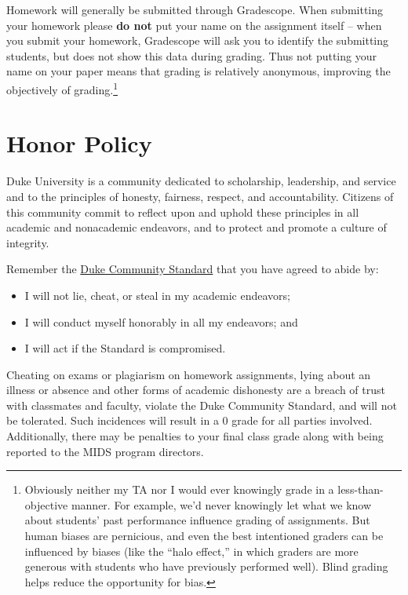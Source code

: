 \documentclass[12pt]{article}
\begin{document}
Homework will generally be submitted through Gradescope. When submitting your homework please {\color{red}\textbf{do not}} put your name on the assignment itself -- when you submit your homework, Gradescope will ask you to identify the submitting students, but does not show this data during grading. Thus not putting your name on your paper means that grading is relatively anonymous, improving the objectively of grading.\footnote{Obviously neither my TA nor I would ever knowingly grade in a less-than-objective manner. For example, we'd never knowingly let what we know about students' past performance influence grading of assignments. But human biases are pernicious, and even the best intentioned graders can be influenced by biases (like the ``halo effect,'' in which graders are more generous with students who have previously performed well). Blind grading helps reduce the opportunity for bias.}


\section{Honor Policy}

Duke University is a community dedicated to scholarship, leadership, and service and to the principles of honesty, fairness, respect, and accountability. Citizens of this community commit to reflect upon and uphold these principles in all academic and nonacademic endeavors, and to protect and promote a culture of integrity.

Remember the \href{https://studentaffairs.duke.edu/conduct/about-us/duke-community-standard}{Duke Community Standard} that you have agreed to abide by:

\begin{itemize}
	\item I will not lie, cheat, or steal in my academic endeavors;
	\item I will conduct myself honorably in all my endeavors; and
	\item I will act if the Standard is compromised.
\end{itemize}

Cheating on exams or plagiarism on homework assignments, lying about an illness or absence and other forms of academic dishonesty are a breach of trust with classmates and faculty, violate the Duke Community Standard, and will not be tolerated. Such incidences will result in a 0 grade for all parties involved. Additionally, there may be penalties to your final class grade along with being reported to the MIDS program directors.
\end{document}
